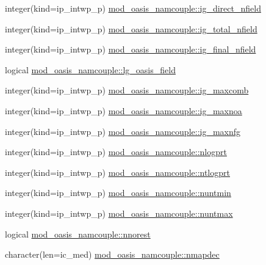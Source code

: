 \begin{DoxyCompactItemize}
\item 
integer(kind=ip\+\_\+intwp\+\_\+p) \hyperlink{namespacemod__oasis__namcouple_a531825c07a164f6139e5eebd59e295a2}{mod\+\_\+oasis\+\_\+namcouple\+::ig\+\_\+direct\+\_\+nfield}
\item 
integer(kind=ip\+\_\+intwp\+\_\+p) \hyperlink{namespacemod__oasis__namcouple_a3de3e6eb2bf1e81d77e9c117b7d5985f}{mod\+\_\+oasis\+\_\+namcouple\+::ig\+\_\+total\+\_\+nfield}
\item 
integer(kind=ip\+\_\+intwp\+\_\+p) \hyperlink{namespacemod__oasis__namcouple_a7cf04d6fb678ee65b7fbedc56a0d680a}{mod\+\_\+oasis\+\_\+namcouple\+::ig\+\_\+final\+\_\+nfield}
\item 
logical \hyperlink{namespacemod__oasis__namcouple_aaf6b923ffc7763fd37a5c4c72bdfa34d}{mod\+\_\+oasis\+\_\+namcouple\+::lg\+\_\+oasis\+\_\+field}
\item 
integer(kind=ip\+\_\+intwp\+\_\+p) \hyperlink{namespacemod__oasis__namcouple_abba00866a740567bc1d93cf5850042fd}{mod\+\_\+oasis\+\_\+namcouple\+::ig\+\_\+maxcomb}
\item 
integer(kind=ip\+\_\+intwp\+\_\+p) \hyperlink{namespacemod__oasis__namcouple_ae66cf9f63b6c440406c9b675caef7759}{mod\+\_\+oasis\+\_\+namcouple\+::ig\+\_\+maxnoa}
\item 
integer(kind=ip\+\_\+intwp\+\_\+p) \hyperlink{namespacemod__oasis__namcouple_aab2d4bcc2dc767df51f99f907f4f3e6e}{mod\+\_\+oasis\+\_\+namcouple\+::ig\+\_\+maxnfg}
\item 
integer(kind=ip\+\_\+intwp\+\_\+p) \hyperlink{namespacemod__oasis__namcouple_a7b8c924fdea622759b99d8f61e03ade5}{mod\+\_\+oasis\+\_\+namcouple\+::nlogprt}
\item 
integer(kind=ip\+\_\+intwp\+\_\+p) \hyperlink{namespacemod__oasis__namcouple_a49bd874b06648257f7ce70da19a678b4}{mod\+\_\+oasis\+\_\+namcouple\+::ntlogprt}
\item 
integer(kind=ip\+\_\+intwp\+\_\+p) \hyperlink{namespacemod__oasis__namcouple_a9add83d816dc5cdb41c84747f4ee8962}{mod\+\_\+oasis\+\_\+namcouple\+::nuntmin}
\item 
integer(kind=ip\+\_\+intwp\+\_\+p) \hyperlink{namespacemod__oasis__namcouple_ab47490a015fa09cf75a760dadfeb0ff9}{mod\+\_\+oasis\+\_\+namcouple\+::nuntmax}
\item 
logical \hyperlink{namespacemod__oasis__namcouple_adb02545191d2ca9c1daff1a3ced2223f}{mod\+\_\+oasis\+\_\+namcouple\+::nnorest}
\item 
character(len=ic\+\_\+med) \hyperlink{namespacemod__oasis__namcouple_af56d31837b48a43e234bccbf1a3e2954}{mod\+\_\+oasis\+\_\+namcouple\+::nmapdec}

\end{DoxyCompactItemize}
